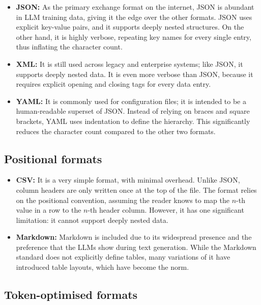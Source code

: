\begin{itemize}
  \item \textbf{JSON:} As the primary exchange format on the internet, JSON is abundant in LLM training data,
    giving it the edge over the other formats. JSON uses explicit key-value pairs, and it supports deeply
    nested structures. On the other hand, it is highly verbose, repeating key names for every single entry,
    thus inflating the character count.

  \item \textbf{XML:} It is still used across legacy and enterprise systems; like JSON, it supports deeply
    nested data. It is even more verbose than JSON, because it requires explicit opening and closing tags for
    every data entry.

  \item \textbf{YAML:} It is commonly used for configuration files; it is intended to be a human-readable
    superset of JSON. Instead of relying on braces and square brackets, YAML uses indentation to define the
    hierarchy. This significantly reduces the character count compared to the other two formats.
\end{itemize}

\subsection{Positional formats}

\begin{itemize}
  \item \textbf{CSV:} It is a very simple format, with minimal overhead. Unlike JSON, column headers are only
    written once at the top of the file. The format relies on the positional convention, assuming the reader
    knows to map the $n$-th value in a row to the $n$-th header column. However, it has one significant
    limitation: it cannot support deeply nested data.
  \item \textbf{Markdown:} Markdown is included due to its widespread presence and the preference that the
    LLMs show during text generation. While the Markdown standard does not explicitly define tables, many
    variations of it have introduced table layouts, which have become the norm.
\end{itemize}

\subsection{Token-optimised formats}

